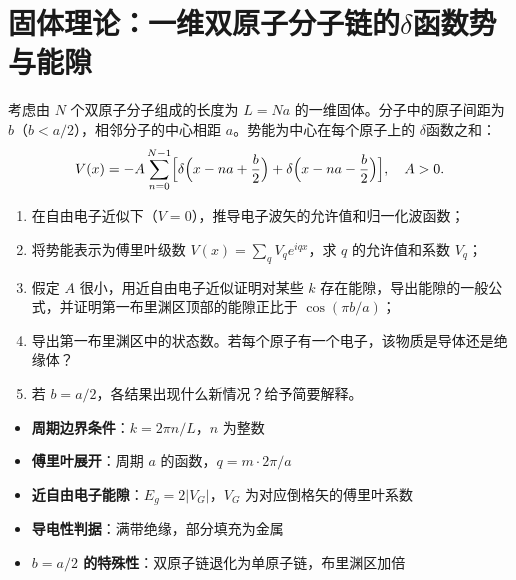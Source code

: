 \section{固体理论：一维双原子分子链的$\delta$函数势与能隙}
\label{sec:1d-diatomic-delta}

\begin{modelbox}[题目：一维双原子分子链的近自由电子能带]
考虑由 $N$ 个双原子分子组成的长度为 $L=Na$ 的一维固体。分子中的原子间距为 $b$（$b<a/2$），相邻分子的中心相距 $a$。势能为中心在每个原子上的 $\delta$函数之和：
\[
V(x) = -A\sum_{n=0}^{N-1}\Bigl[\delta\Bigl(x-na+\frac{b}{2}\Bigr)+\delta\Bigl(x-na-\frac{b}{2}\Bigr)\Bigr],\quad A>0.
\]
\begin{enumerate}
    \item 在自由电子近似下（$V=0$），推导电子波矢的允许值和归一化波函数；
    \item 将势能表示为傅里叶级数 $V(x)=\sum_q V_q e^{iqx}$，求 $q$ 的允许值和系数 $V_q$；
    \item 假定 $A$ 很小，用近自由电子近似证明对某些 $k$ 存在能隙，导出能隙的一般公式，并证明第一布里渊区顶部的能隙正比于 $\cos(\pi b/a)$；
    \item 导出第一布里渊区中的状态数。若每个原子有一个电子，该物质是导体还是绝缘体？
    \item 若 $b=a/2$，各结果出现什么新情况？给予简要解释。
\end{enumerate}
\end{modelbox}

\begin{tipbox}[考点快速分析]
\begin{itemize}
    \item \textbf{周期边界条件}：$k=2\pi n/L$，$n$ 为整数
    \item \textbf{傅里叶展开}：周期 $a$ 的函数，$q=m\cdot2\pi/a$
    \item \textbf{近自由电子能隙}：$E_g=2|V_G|$，$V_G$ 为对应倒格矢的傅里叶系数
    \item \textbf{导电性判据}：满带绝缘，部分填充为金属
    \item \textbf{$b=a/2$ 的特殊性}：双原子链退化为单原子链，布里渊区加倍
\end{itemize}
\end{tipbox}

